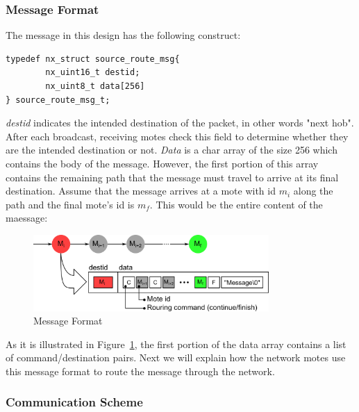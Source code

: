 \documentclass[11pt, titlepage, oneside]{article}
\begin{document}
\subsubsection{Message Format} 
The message in this design has the following construct: 
 
\begin{lstlisting}[label=some-code,caption=Message Construct] 
typedef nx_struct source_route_msg{ 
        nx_uint16_t destid; 
        nx_uint8_t data[256] 
} source_route_msg_t; 
\end{lstlisting} 
 
{\it destid} indicates the intended destination of the packet, in other words "next hob". After each broadcast, receiving motes check this field to determine whether they are the intended destination or not. {\it Data} is a char array of the size 256 which contains the body of the message. However, the first portion of this array contains the remaining path that the message must travel to arrive at its final destination. Assume that the message arrives at a mote with id \begin{math}m_i\end{math} along the path and the final mote's id is \begin{math}m_f\end{math}. This would be the entire content of the maessage: 
 
\begin{figure}[h] 
  \centering 
      \includegraphics[width=0.8\textwidth]{message_format.png} 
  \caption{Message Format} 
\label{fig:msgfrmt} 
\end{figure} 
 
As it is illustrated in Figure~\ref{fig:msgfrmt}, the first portion of the data array contains a list of command/destination pairs. Next we will explain how the network motes use this message format to route the message through the network. 
 
\subsubsection{Communication Scheme} 
 
\end{document}
